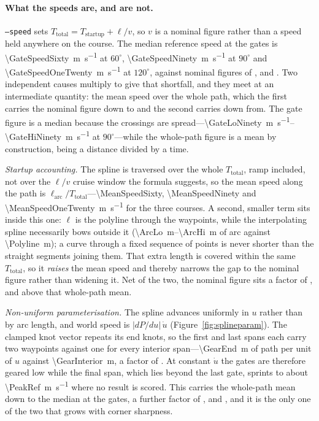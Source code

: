 \documentclass[11pt,a4paper]{article}
\begin{document}
\paragraph{What the speeds are, and are not.} \texttt{--speed} sets
$T_{\text{total}} = T_{\text{startup}} + \ell/v$, so $v$ is a nominal figure
rather than a speed held anywhere on the course. The median reference speed at
the gates is \SI{\GateSpeedSixty}{\metre\per\second} at $60^\circ$,
\SI{\GateSpeedNinety}{\metre\per\second} at $90^\circ$ and
\SI{\GateSpeedOneTwenty}{\metre\per\second} at $120^\circ$, against nominal
figures of \BestSixty{}, \BestNinety{} and \BestOneTwenty{}. Two independent
causes multiply to give that shortfall, and they meet at an intermediate
quantity: the mean speed over the whole path, which the first carries the
nominal figure down to and the second carries down from. The gate figure is a
median because the crossings are spread---\SIrange{\GateLoNinety}{\GateHiNinety}{\metre\per\second}
at $90^\circ$---while the whole-path figure is a mean by construction, being a
distance divided by a time.

\emph{Startup accounting.} The spline is traversed over the whole
$T_{\text{total}}$, ramp included, not over the $\ell/v$ cruise window the
formula suggests, so the mean speed along the path is $\ell_{\text{arc}} /
T_{\text{total}}$---\SI{\MeanSpeedSixty}{}, \SI{\MeanSpeedNinety}{} and
\SI{\MeanSpeedOneTwenty}{\metre\per\second} for the three courses. A second,
smaller term sits inside this one: $\ell$ is the polyline through the
waypoints, while the interpolating spline necessarily bows outside it
(\SIrange{\ArcLo}{\ArcHi}{\metre} of arc against \SI{\Polyline}{\metre}); a
curve through a fixed sequence of points is never shorter than the straight
segments joining them. That extra length is covered within the same
$T_{\text{total}}$, so it \emph{raises} the mean speed and thereby narrows the
gap to the nominal figure rather than widening it. Net of the two, the nominal
figure sits a factor of \StartupFacSixty{}, \StartupFacNinety{} and
\StartupFacOneTwenty{} above that whole-path mean.

\emph{Non-uniform parameterisation.} The spline advances uniformly in $u$
rather than by arc length, and world speed is $|dP/du|\,\dot u$
(Figure~\ref{fig:splineparam}). The clamped knot vector repeats its end knots,
so the first and last spans each carry two waypoints against one for every
interior span---\SI{\GearEnd}{\metre} of path per unit of $u$ against
\SI{\GearInterior}{\metre}, a factor of \GearRatio{}. At constant $\dot u$ the
gates are therefore geared low while the final span, which lies beyond the last
gate, sprints to about \SI{\PeakRef}{\metre\per\second} where no result is
scored. This carries the whole-path mean down to the median at the gates, a
further factor of \GearingFacSixty{}, \GearingFacNinety{} and
\GearingFacOneTwenty{}, and it is the only one of the two that grows with
corner sharpness.
\end{document}
